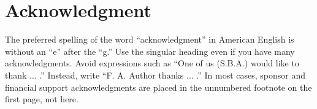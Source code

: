 \section*{Acknowledgment}

The preferred spelling of the word ``acknowledgment'' in American English is without an ``e'' after the ``g.''
Use the singular heading even if you have many acknowledgments. Avoid expressions such as ``One of us (S.B.A.) would like to thank ... .''
Instead, write ``F. A. Author thanks ... .'' In most cases, sponsor and financial support acknowledgments are placed in the unnumbered footnote on the first page, not here.